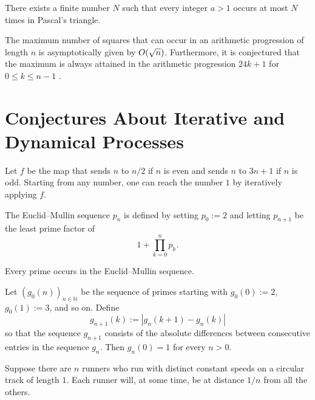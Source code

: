 \begin{conjecture}
  There exists a finite number $N$ such that every integer $a>1$ occurs at most $N$ times in Pascal's triangle.
\end{conjecture}

\begin{conjecture}
  The maximum number of squares that can occur in an arithmetic progression of length $n$ is asymptotically given by $O(\sqrt{n})$. Furthermore, it is conjectured that the maximum is always attained in the arithmetic progression $24k+1$ for $0\leq k\leq n-1$ \cite{rudin1960}.
\end{conjecture}

\section{Conjectures About Iterative and Dynamical Processes}

\begin{conjecture}
  Let $f$ be the map that sends $n$ to $n/2$ if $n$ is even and sends $n$ to $3n+1$ if $n$ is odd. Starting from any number, one can reach the number $1$ by iteratively applying $f$.
\end{conjecture}

The Euclid--Mullin sequence $p_n$ is defined by setting $p_0:=2$ and letting $p_{n+1}$ be the least prime factor of
\begin{equation*}
  1+\prod_{k=0}^np_k.
\end{equation*}

\begin{conjecture}
  Every prime occurs in the Euclid--Mullin sequence.
\end{conjecture}

\begin{conjecture}
  Let $(g_0(n))_{n\in\mathbb{N}}$ be the sequence of primes starting with $g_0(0):=2$, $g_0(1):=3$, and so on. Define
  \begin{equation*}
    g_{n+1}(k):=|g_n(k+1)-g_n(k)|
  \end{equation*}
  so that the sequence $g_{n+1}$ consists of the absolute differences between consecutive entries in the sequence $g_n$. Then $g_n(0)=1$ for every $n>0$.
\end{conjecture}

\begin{conjecture}
  Suppose there are $n$ runners who run with distinct constant speeds on a circular track of length $1$. Each runner will, at some time, be at distance $1/n$ from all the others.
\end{conjecture}

